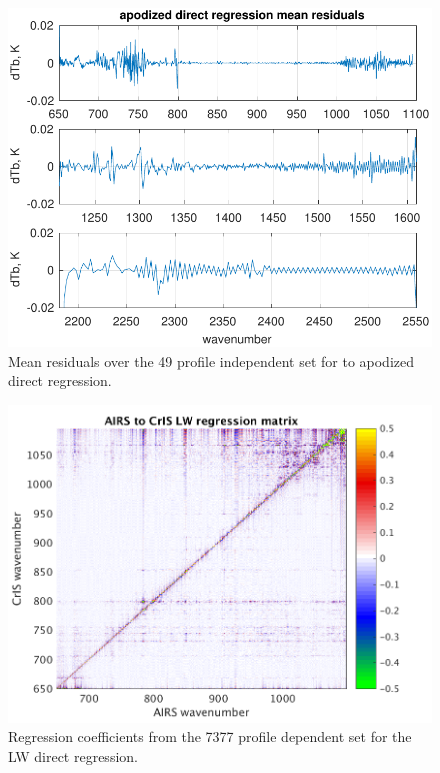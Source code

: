 \documentclass[10pt,twocolumn]{article}
\begin{document}
\begin{figure} %
  \centering
  \includegraphics[width=\linewidth]{figures/ap_dir_regr.pdf}
  \caption{Mean residuals over the 49 profile independent set for
    {\airs} to apodized {\cris} direct regression.}
  \label{dreg1}
\end{figure}

\begin{figure} %
  \centering
  \includegraphics[width=\linewidth]{figures/LW_dir_regr_mat.png}
  \caption{Regression coefficients from the 7377 profile dependent set for
  the LW direct regression.}
  \label{dreg3}
\end{figure}
\end{document}
